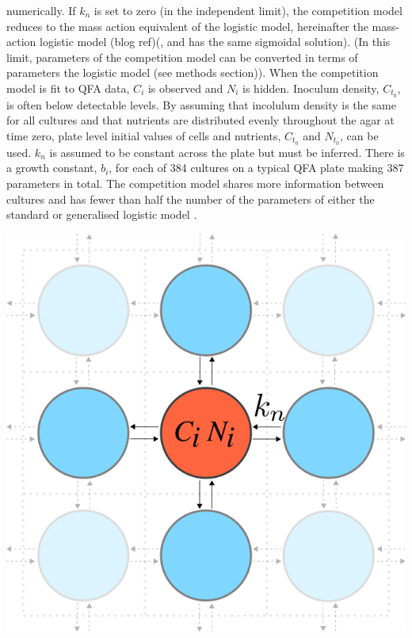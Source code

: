 numerically. If \(k_{n}\) is set to zero (in the independent limit),
the competition model reduces to the mass action equivalent of the
logistic model, hereinafter the mass-action logistic model (blog
ref)(, and has the same sigmoidal solution). (In this limit,
parameters of the competition model can be converted in terms of
parameters the logistic model (see methods section)).
When the competition model is fit to QFA data, \(C_{i}\) is observed
and \(N_{i}\) is hidden. Inoculum density, \(C_{t_{0}}\), is often
below detectable levels. By assuming that incolulum density is the
same for all cultures and that nutrients are distributed evenly
throughout the agar at time zero, plate level initial values of cells
and nutrients, \(C_{t_{0}}\) and \(N_{t_{0}}\), can be used. \(k_{n}\)
is assumed to be constant across the plate but must be inferred. There
is a growth constant, \(b_{i}\), for each of 384 cultures on a typical
QFA plate making 387 parameters in total. The competition model shares
more information between cultures and has fewer than half the number
of the parameters of either the standard or generalised logistic model
\citep{Banks2012,qfa2016}.
\begin{Figure}
  \centering
  \includegraphics[width=\linewidth]{comp_model/comp_model_schematic}
  \label{fig:comp_model_schematic}
\end{Figure}

